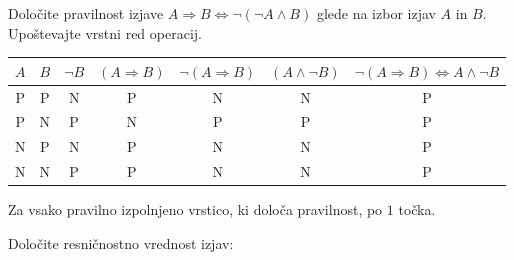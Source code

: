 \documentclass[addpoints,12pt]{exam}
\begin{document}
\begin{questions}
\newpage
    
    \question[4]
    Določite pravilnost izjave $ A\Rightarrow  B\Leftrightarrow \lnot(\lnot A\land B)$ glede na izbor izjav $A$ in $B$. Upoštevajte vrstni red operacij.

    \begin{solution}[14cm]
        \begin{table}[H]
            \begin{tabular}{ccccccc}
             $A$ & $B$ & $\lnot B$ & $(A\Rightarrow B)$ & $\lnot(A\Rightarrow B)$ & $(A\land \lnot B)$ & $\lnot( A\Rightarrow  B)\Leftrightarrow A\land \lnot B$\\ \hline
             P & P & N & P & N & N & P \\ 
             P & N & P & N & P & P & P \\
             N & P & N & P & N & N & P \\
             N & N & P & P & N & N & P
            \end{tabular}
        \end{table}
        Za vsako pravilno izpolnjeno vrstico, ki določa pravilnost, po $1$ točka.

    \end{solution}




    \question[2]
    Določite resničnostno vrednost izjav:


\end{questions}
\end{document}
